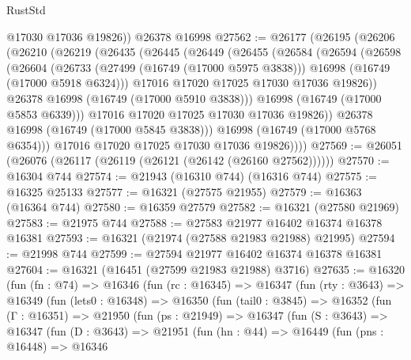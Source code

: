 \begin{lexlean}{RustStd}
\begin{coremodule}
        @17030
        @17036
        @19826))
    @26378
    @16998
@27562 := @26177
    (@26195
      (@26206
        (@26210
          (@26219
            (@26435
              (@26445
                (@26449
                  (@26455
                    (@26584
                      (@26594
                        (@26598
                          (@26604
                            (@26733
                              (@27499 (@16749 (@17000 @5975 @3838)))
                              @16998
                              (@16749 (@17000 @5918 @6324)))
                            @17016
                            @17020
                            @17025
                            @17030
                            @17036
                            @19826))
                        @26378
                        @16998
                        (@16749 (@17000 @5910 @3838)))
                      @16998
                      (@16749 (@17000 @5853 @6339)))
                    @17016
                    @17020
                    @17025
                    @17030
                    @17036
                    @19826))
                @26378
                @16998
                (@16749 (@17000 @5845 @3838)))
              @16998
              (@16749 (@17000 @5768 @6354)))
            @17016
            @17020
            @17025
            @17030
            @17036
            @19826))))
@27569 := @26051 (@26076 (@26117 (@26119 (@26121 (@26142 (@26160 @27562))))))
@27570 := @16304 @744
@27574 := @21943 (@16310 @744) (@16316 @744)
@27575 := @16325 @25133
@27577 := @16321 (@27575 @21955)
@27579 := @16363 (@16364 @744)
@27580 := @16359 @27579
@27582 := @16321 (@27580 @21969)
@27583 := @21975 @744
@27588 := @27583 @21977 @16402 @16374 @16378 @16381
@27593 := @16321 (@21974 (@27588 @21983 @21988) @21995)
@27594 := @21998 @744
@27599 := @27594 @21977 @16402 @16374 @16378 @16381
@27604 := @16321 (@16451 (@27599 @21983 @21988) @3716)
@27635 := @16320
    (fun (fn : @74) =>
    @16346
      (fun (rc : @16345) =>
      @16347
        (fun (rty : @3643) =>
        @16349
          (fun (lets0 : @16348) =>
          @16350
            (fun (tail0 : @3845) =>
            @16352
              (fun (Γ : @16351) =>
              @21950
                (fun (ps : @21949) =>
                @16347
                  (fun (S : @3643) =>
                  @16347
                    (fun (D : @3643) =>
                    @21951
                      (fun (hn : @44) =>
                      @16449
                        (fun (pns : @16448) =>
                        @16346

\end{coremodule}
\end{lexlean}

